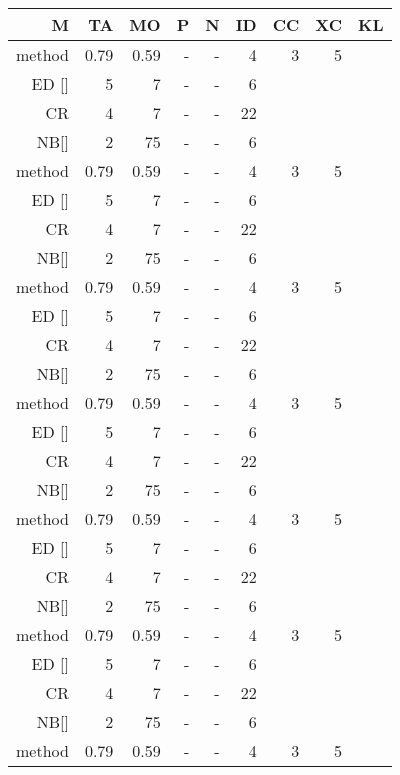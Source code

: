 \documentclass[twocolumn]{article}
\begin{document}
\begin {table*}[tp]
\begin{tabular*}{\textwidth}{@{\hskip 6pt\extracolsep{\stretch{1}}}*{9}{r}}
\hline
M       & TA    & MO    & P & N & ID & CC & XC & KL \\
\hline
method  & 0.79  & 0.59  & - & - & 4  & 3  & 5  &    \\
ED  []  & 5     & 7     & - & - & 6  &    &    &    \\
CR      & 4     & 7     & - & - & 22 &    &    &    \\
NB[]    & 2     & 75    & - & - & 6  &    &    &    \\
method  & 0.79  & 0.59  & - & - & 4  & 3  & 5  &    \\
ED  []  & 5     & 7     & - & - & 6  &    &    &    \\
CR      & 4     & 7     & - & - & 22 &    &    &    \\
NB[]    & 2     & 75    & - & - & 6  &    &    &    \\
method  & 0.79  & 0.59  & - & - & 4  & 3  & 5  &    \\
ED  []  & 5     & 7     & - & - & 6  &    &    &    \\
CR      & 4     & 7     & - & - & 22 &    &    &    \\
NB[]    & 2     & 75    & - & - & 6  &    &    &    \\
method  & 0.79  & 0.59  & - & - & 4  & 3  & 5  &    \\
ED  []  & 5     & 7     & - & - & 6  &    &    &    \\
CR      & 4     & 7     & - & - & 22 &    &    &    \\
NB[]    & 2     & 75    & - & - & 6  &    &    &    \\
method  & 0.79  & 0.59  & - & - & 4  & 3  & 5  &    \\
ED  []  & 5     & 7     & - & - & 6  &    &    &    \\
CR      & 4     & 7     & - & - & 22 &    &    &    \\
NB[]    & 2     & 75    & - & - & 6  &    &    &    \\
method  & 0.79  & 0.59  & - & - & 4  & 3  & 5  &    \\
ED  []  & 5     & 7     & - & - & 6  &    &    &    \\
CR      & 4     & 7     & - & - & 22 &    &    &    \\
NB[]    & 2     & 75    & - & - & 6  &    &    &    \\
method  & 0.79  & 0.59  & - & - & 4  & 3  & 5  &    \\

\end{tabular*}
\end{table*}
\end{document}
